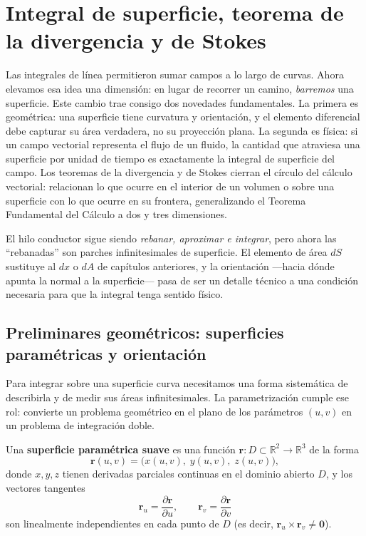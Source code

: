 \chapter{Integral de superficie, teorema de la divergencia y de Stokes}
\label{ch:superficies}

Las integrales de línea permitieron sumar campos a lo largo de curvas. Ahora elevamos esa idea una dimensión: en lugar de recorrer un camino, \emph{barremos} una superficie. Este cambio trae consigo dos novedades fundamentales. La primera es geométrica: una superficie tiene curvatura y orientación, y el elemento diferencial debe capturar su área verdadera, no su proyección plana. La segunda es física: si un campo vectorial representa el flujo de un fluido, la cantidad que atraviesa una superficie por unidad de tiempo es exactamente la integral de superficie del campo. Los teoremas de la divergencia y de Stokes cierran el círculo del cálculo vectorial: relacionan lo que ocurre en el interior de un volumen o sobre una superficie con lo que ocurre en su frontera, generalizando el Teorema Fundamental del Cálculo a dos y tres dimensiones.

\begin{rem}
El hilo conductor sigue siendo \emph{rebanar, aproximar e integrar}, pero ahora las ``rebanadas'' son parches infinitesimales de superficie. El elemento de área $dS$ sustituye al $dx$ o $dA$ de capítulos anteriores, y la orientación —hacia dónde apunta la normal a la superficie— pasa de ser un detalle técnico a una condición necesaria para que la integral tenga sentido físico.
\end{rem}

\section{Preliminares geométricos: superficies paramétricas y orientación}

Para integrar sobre una superficie curva necesitamos una forma sistemática de describirla y de medir sus áreas infinitesimales. La parametrización cumple ese rol: convierte un problema geométrico en el plano de los parámetros $(u,v)$ en un problema de integración doble.

\begin{definition}
Una \textbf{superficie paramétrica suave} es una función $\mathbf{r}: D \subset \mathbb{R}^2 \to \mathbb{R}^3$ de la forma
\[
\mathbf{r}(u,v) = \bigl( x(u,v),\; y(u,v),\; z(u,v) \bigr),
\]
donde $x,y,z$ tienen derivadas parciales continuas en el dominio abierto $D$, y los vectores tangentes
\[
\mathbf{r}_u = \frac{\partial \mathbf{r}}{\partial u}, \qquad
\mathbf{r}_v = \frac{\partial \mathbf{r}}{\partial v}
\]
son linealmente independientes en cada punto de $D$ (es decir, $\mathbf{r}_u \times \mathbf{r}_v \neq \mathbf{0}$).
\end{definition}

